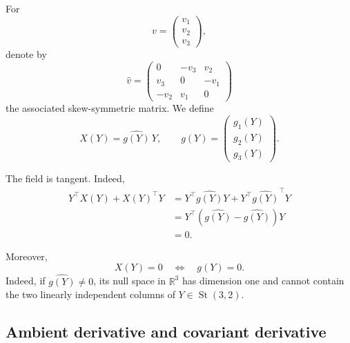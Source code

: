 \documentclass[11pt]{article}
\newcommand{\R}{\mathbb{R}}
\begin{document}
For
\[
    v=
    \begin{pmatrix}
        v_1\\v_2\\v_3
    \end{pmatrix},
\]
denote by
\[
    \widehat v
    =
    \begin{pmatrix}
        0&-v_3&v_2\\
        v_3&0&-v_1\\
        -v_2&v_1&0
    \end{pmatrix}
\]
the associated skew-symmetric matrix. We define
\begin{equation}\label{eq:field_stiefel}
    X(Y)
    =
    \widehat{g(Y)}\,Y,
    \qquad
    g(Y)=
    \begin{pmatrix}
        g_1(Y)\\g_2(Y)\\g_3(Y)
    \end{pmatrix}.
\end{equation}

The field is tangent. Indeed,
\[
\begin{aligned}
    Y^\top X(Y)+X(Y)^\top Y
    &=
    Y^\top\widehat{g(Y)}Y
    +
    Y^\top\widehat{g(Y)}^\top Y\\
    &=
    Y^\top
    \left(
        \widehat{g(Y)}
        -
        \widehat{g(Y)}
    \right)
    Y\\
    &=0.
\end{aligned}
\]

Moreover,
\[
    X(Y)=0
    \quad\Longleftrightarrow\quad
    g(Y)=0.
\]
Indeed, if $\widehat{g(Y)}\neq0$, its null space in $\R^3$ has dimension
one and cannot contain the two linearly independent columns of
$Y\in\operatorname{St}(3,2)$.

\subsection*{Ambient derivative and covariant derivative}
\end{document}
